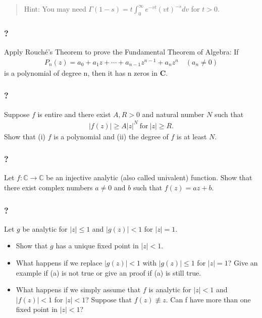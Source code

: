 \begin{quote}
Hint: You may need
\(\displaystyle{\Gamma(1-s)=t \int_0^{\infty}e^{-vt}(vt)^{-s} dv}\) for
\(t>0\).
\end{quote}

\hypertarget{section-134}{%
\subsubsection{?}\label{section-134}}

Apply Rouché's Theorem to prove the Fundamental Theorem of Algebra: If
\begin{align*}P_n(z) = a_0 + a_1z + \cdots + a_{n-1}z^{n-1} + a_nz^n\quad  (a_n \neq 0)\end{align*}
is a polynomial of degree n, then it has n zeros in \(\mathbf C\).

\hypertarget{section-135}{%
\subsubsection{?}\label{section-135}}

Suppose \(f\) is entire and there exist \(A, R >0\) and natural number
\(N\) such that
\begin{align*}|f(z)| \geq A |z|^N\ \text{for}\ |z| \geq R.\end{align*}
Show that (i) \(f\) is a polynomial and (ii) the degree of \(f\) is at
least \(N\).

\hypertarget{section-136}{%
\subsubsection{?}\label{section-136}}

Let \(f: {\mathbb C} \rightarrow {\mathbb C}\) be an injective analytic
(also called univalent) function. Show that there exist complex numbers
\(a \neq 0\) and \(b\) such that \(f(z) = az + b\).

\hypertarget{section-137}{%
\subsubsection{?}\label{section-137}}

Let \(g\) be analytic for \(|z|\leq 1\) and \(|g(z)| < 1\) for
\(|z| = 1\).

\begin{itemize}
\item
  Show that \(g\) has a unique fixed point in \(|z| < 1\).
\item
  What happens if we replace \(|g(z)| < 1\) with \(|g(z)|\leq 1\) for
  \(|z|=1\)? Give an example if (a) is not true or give an proof if (a)
  is still true.
\item
  What happens if we simply assume that \(f\) is analytic for
  \(|z| < 1\) and \(|f(z)| < 1\) for \(|z| < 1\)? Suppose that
  \(f(z) \not\equiv z\). Can f have more than one fixed point in
  \(|z| < 1\)?
\end{itemize}

